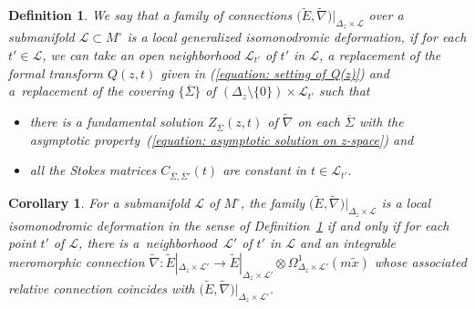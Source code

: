 \documentclass[pdftex]{sigma}
\numberwithin{equation}{section}
\newtheorem{Corollary}[Theorem]{Corollary}
\newtheorem{Definition}[Theorem]{Definition}
\begin{document}
\begin{Definition}\label{definition: ramified local generalized isomonodromic deformation}
We say that a family of connections
$\big(\tilde{E},\tilde{\nabla}\big)|_{\Delta_z\times {\mathcal L}}$
over a submanifold ${\mathcal L}\subset M^{\circ}$
is a local generalized isomonodromic deformation,
if for each $t'\in{\mathcal L}$,
we can take an open neighborhood ${\mathcal L}_{t'}$ of $t'$ in ${\mathcal L}$,
a replacement of the formal transform $Q(z,t)$
given in (\ref{equation: setting of Q(z)})
and a~replacement of the covering $\{\overline{\Sigma}\}$
of $(\Delta_z\setminus\{0\})\times {\mathcal L}_{t'}$
such that
\begin{itemize}\itemsep=0pt
\item[(i)]
there is a fundamental solution
$Z_{\overline{\Sigma}}(z,t)$ of $\tilde{\nabla}$
on each $\overline{\Sigma}$
with the asymptotic property~(\ref{equation: asymptotic solution on z-space})
and
\item[(ii)]
all the Stokes matrices $C_{\overline{\Sigma},\overline{\Sigma}'}(t)$ are constant in
$t\in {\mathcal L}_{t'}$.
\end{itemize}
\end{Definition}

\begin{Corollary}\label{corollary: rigorous ramified local generalized isomonodromic deformation}
 For a submanifold ${\mathcal L}$ of $M^{\circ}$,
 the family $\big(\tilde{E},\tilde{\nabla}\big)|_{\Delta_z\times {\mathcal L}}$
 is a local isomonodromic deformation in the sense of
 Definition~{\rm \ref{definition: ramified local generalized isomonodromic deformation}}
 if and only if
 for each point $t'$ of ${\mathcal L}$, there is a~neighborhood~${\mathcal L'}$ of $t'$
 in ${\mathcal L}$ and an integrable meromorphic connection
 $\tilde{\nabla}\colon \tilde{E}|_{\Delta_z \times{\mathcal L'}}
 \longrightarrow \tilde{E}|_{\Delta_z\times{\mathcal L'}}\otimes
 \Omega^1_{\Delta_z\times{\mathcal L'}}(m\tilde{x})$
 whose associated relative connection coincides with
 $\big(\tilde{E},\tilde{\nabla}\big)|_{\Delta_z\times {\mathcal L'}}$.
\end{Corollary}
\end{document}
